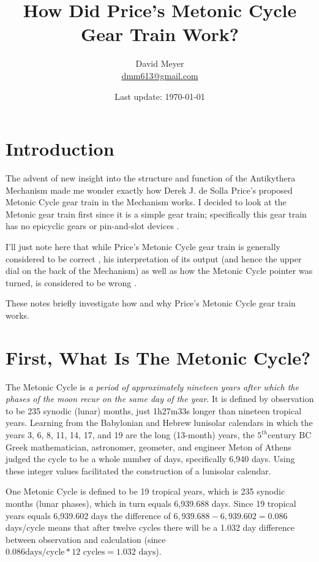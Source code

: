 \documentclass{article}
\title{How Did Price's Metonic Cycle Gear Train Work?}
\author{David Meyer \\ \href{mailto:dmm613@gmail.com}
                            {dmm613@gmail.com}}
\date{Last update: \today}
\theoremstyle{definition}
\begin{document}
\maketitle
%
%
%
\section{Introduction}
The advent of new insight into the structure and function of the
Antikythera Mechanism \cite{Freeth2021} made me wonder exactly
how Derek J. de Solla Price's \cite{wiki:price} proposed Metonic
Cycle gear train in the Mechanism works. I decided to look at the
Metonic gear train first since it is a simple gear train;
specifically this gear train has no epicyclic gears
\cite{Wright2005} or pin-and-slot devices
\cite{pin_and_slot_device,Evans2010}.

\bigskip
\noindent
I'll just note here that while Price's Metonic Cycle gear train
is generally considered to be correct \cite{Freeth2006}, his
interpretation of its output (and hence the upper dial on the
back of the Mechanism) as well as how the Metonic Cycle pointer
was turned, is considered to be wrong
\cite{challenging_the_classic_research}.

\bigskip
\noindent
These notes briefly investigate how and why Price's Metonic Cycle
gear train works. 

\section{First, What Is The Metonic Cycle?}
The Metonic Cycle is \emph{a period of approximately nineteen
years after which the phases of the moon recur on the same day of
the year}. It is defined by observation to be 235 synodic (lunar)
months, just 1h27m33s longer than nineteen tropical
years. Learning from the Babylonian and Hebrew lunisolar
calendars in which the years 3, 6, 8, 11, 14, 17, and 19 are the
long (13-month) years, the $5^{th} \text{century BC}$ Greek
mathematician, astronomer, geometer, and engineer Meton of Athens
\cite{wiki:menton} judged the cycle to be a whole number of days,
specifically 6,940 days. Using these integer values facilitated
the construction of a lunisolar calendar.

\bigskip
\noindent
One Metonic Cycle is defined to be 19 tropical years, which is
235 synodic months (lunar phases), which in turn equals 6,939.688
days. Since 19 tropical years equals 6,939.602 days the
difference of $6,939.688 - 6,939.602 = 0.086$ days/cycle means
that after twelve cycles there will be a 1.032 day difference
between observation and calculation (since $0.086 \text{
days/cycle} * 12 \text{ cycles} = 1.032 \text{ days}$).
\end{document}
